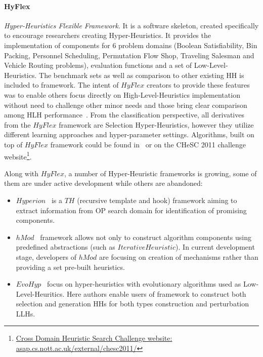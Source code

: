 \paragraph{HyFlex~\cite{ochoa2012hyflex}}\textit{Hyper-Heuristics Flexible Framework}. It is a software skeleton, created specifically to encourage researchers creating Hyper-Heuristics. It provides the implementation of components for 6 problem domains (Boolean Satisfiability, Bin Packing, Personnel Scheduling, Permutation Flow Shop, Traveling Salesman and Vehicle Routing problems), evaluation functions and a set of Low-Level-Heuristics. The benchmark sets as well as comparison to other existing HH is included to framework. The intent of $HyFlex$ creators to provide these features was to enable others focus directly on High-Level-Heuristics implementation without need to challenge other minor needs and those bring clear comparison among HLH performance~\cite{ochoa2012hyflex}. From the classification perspective, all derivatives from the $HyFlex$ framework are Selection Hyper-Heuristics, however they utilize different learning approaches and hyper-parameter settings. Algorithms, built on top of $HyFlex$ framework could be found in~\cite{misir2012intelligent,ryser2014review,drake2019recent} or on the CHeSC 2011 challenge website\footnote[1]{\href{http://www.asap.cs.nott.ac.uk/external/chesc2011/}{Cross Domain Heuristic Search Challenge website: asap.cs.nott.ac.uk/external/chesc2011/}}.


Along with $HyFlex$, a number of Hyper-Heuristic frameworks is growing, some of them are under active development while others are abandoned:
\begin{itemize}
	\item $Hyperion$~\cite{swan2011hyperion} is a $TH$ (recursive template and hook) framework aiming to extract information from OP search domain for identification of promising components.
	
	\item $hMod$~\cite{urra2013hMod} framework allows not only to construct algorithm components using predefined abstractions (such as $IterativeHeuristic$). In current development stage, developers of $hMod$ are focusing on creation of mechanisms rather than providing a set pre-built heuristics. 
	
	\item $EvoHyp$~\cite{pillay2017evohyp} focus on hyper-heuristics with evolutionary algorithms used as Low-Level-Heuritics. Here authors enable users of framework to construct both selection and generation HHs for both types construction and perturbation LLHs.
	
\end{itemize} 

